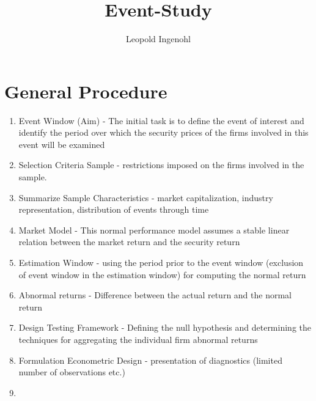 \documentclass[12pt]{article}
\title{Event-Study}
\author{Leopold Ingenohl}
\begin{document}
\maketitle

\section{General Procedure}


\begin{enumerate}
	\item Event Window (Aim) - The initial task is to define the event of interest and identify the period over which the security prices of the firms involved in this event will be examined
	\item Selection Criteria Sample - restrictions imposed on the firms involved in the sample.
	\item Summarize Sample Characteristics - market capitalization, industry representation, distribution of events through time
	\item Market Model - This normal performance model assumes a stable linear relation between the market return and the security return
	\item Estimation Window - using the period prior to the event window (exclusion of event window in the estimation window) for computing the normal return
	\item Abnormal returns - Difference between the actual return and the normal return 
	\item Design Testing Framework - Defining the null hypothesis and determining the techniques for aggregating the individual firm abnormal returns
	\item Formulation Econometric Design - presentation of diagnostics (limited number of observations etc.)
	\item 
\end{enumerate}
\end{document}
